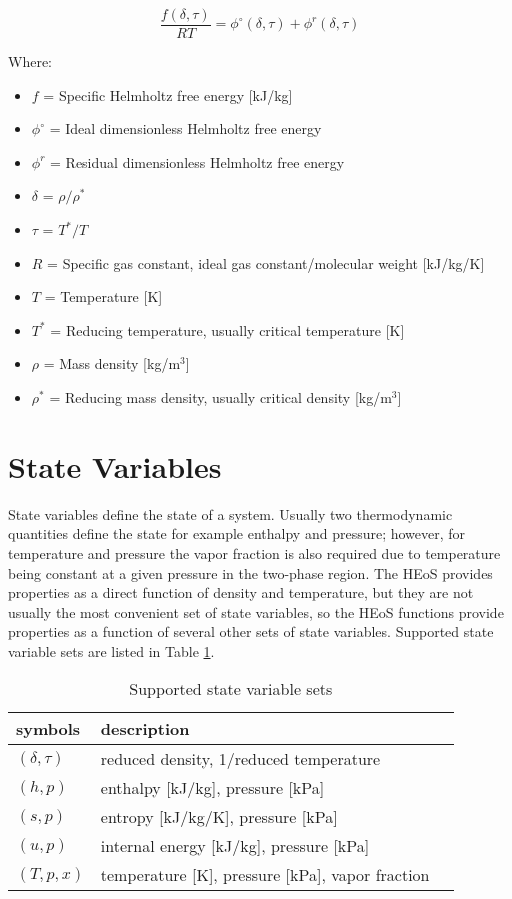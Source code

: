 \documentclass[oneside]{book}
\begin{document}
\begin{equation}\label{eqn:hfe}
	\frac{f(\delta, \tau)}{RT} = \phi^\circ(\delta, \tau) + \phi^r(\delta, \tau)
\end{equation}  

Where:
 \begin{itemize}
 	\item $f$ = Specific Helmholtz free energy [kJ/kg]
	\item $\phi^\circ$ = Ideal dimensionless Helmholtz free energy 
	\item $\phi^r$ = Residual dimensionless Helmholtz free energy
 	\item $\delta$ = $\rho/\rho^*$
	\item $\tau$ = $T^*/T$
	\item $R$ = Specific gas constant, ideal gas constant/molecular weight [kJ/kg/K] 
	\item $T$ = Temperature [K]
	\item $T^*$ = Reducing temperature, usually critical temperature [K]
	\item $\rho$ = Mass density [kg/m$^3$]
	\item $\rho^*$ = Reducing mass density, usually critical density [kg/m$^3$]
 \end{itemize}

 \section{State Variables}
 
State variables define the state of a system.  Usually two thermodynamic quantities define the state for example enthalpy and pressure; however, for temperature and pressure the vapor fraction is also required due to temperature being constant at a given pressure in the two-phase region. The HEoS provides properties as a direct function of density and temperature, but they are not usually the most convenient set of state variables, so the HEoS functions provide properties as a function of several other sets of state variables. Supported state variable sets are listed in Table \ref{table:state_variable_sets}.
 
 \begin{table}[h!]
\centering
\caption{Supported state variable sets}
\begin{tabular}{ l l l }
\hline
symbols & description  \\
\hline
\hline
$(\delta, \tau)$ & reduced density, 1/reduced temperature \\ [1ex]
 $(h, p)$ &  enthalpy [kJ/kg], pressure [kPa]  \\  [1ex]
 $(s, p)$ &  entropy [kJ/kg/K], pressure [kPa]  \\  [1ex]
 $(u, p)$ &  internal energy [kJ/kg], pressure [kPa]  \\  [1ex]
  $(T, p, x)$ & temperature [K], pressure [kPa], vapor fraction  \\  [1ex]
 \hline    
\end{tabular}
\label{table:state_variable_sets}
\end{table}
\end{document}
